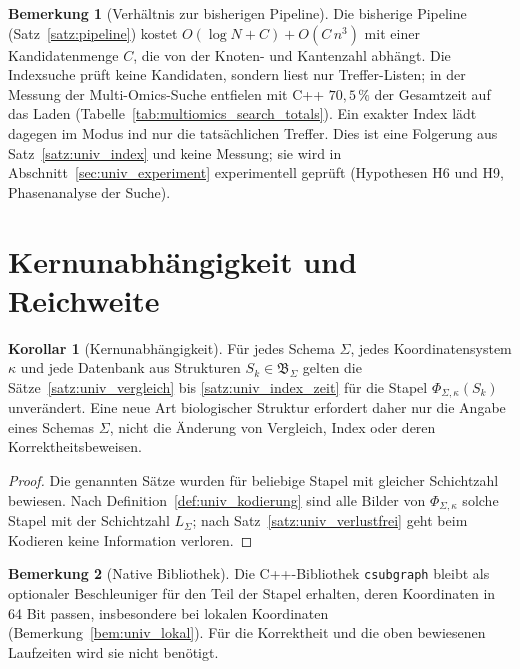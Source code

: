 \documentclass[a4paper,12pt, twoside]{report}
\theoremstyle{definition}
\newtheorem{bemerkung}{Bemerkung}
\newtheorem{korollar}{Korollar}
\begin{document}
\begin{bemerkung}[Verhältnis zur bisherigen Pipeline]
	Die bisherige Pipeline (Satz~\ref{satz:pipeline}) kostet $O(\log N+C)+O(C\,n^3)$ mit einer Kandidatenmenge $C$, die von der Knoten- und Kantenzahl abhängt. Die Indexsuche prüft keine Kandidaten, sondern liest nur Treffer-Listen; in der Messung der Multi-Omics-Suche entfielen mit C++ $70{,}5\,\%$ der Gesamtzeit auf das Laden (Tabelle~\ref{tab:multiomics_search_totals}). Ein exakter Index lädt dagegen im Modus ind nur die tatsächlichen Treffer. Dies ist eine Folgerung aus Satz~\ref{satz:univ_index} und keine Messung; sie wird in Abschnitt~\ref{sec:univ_experiment} experimentell geprüft (Hypothesen H6 und H9, Phasenanalyse der Suche).
\end{bemerkung}

\section{Kernunabhängigkeit und Reichweite}
\label{sec:univ_reichweite}

\begin{korollar}[Kernunabhängigkeit]
	\label{kor:univ_kern}
	Für jedes Schema $\Sigma$, jedes Koordinatensystem $\kappa$ und jede Datenbank aus Strukturen $S_k\in\mathfrak{B}_\Sigma$ gelten die Sätze~\ref{satz:univ_vergleich} bis \ref{satz:univ_index_zeit} für die Stapel $\Phi_{\Sigma,\kappa}(S_k)$ unverändert. Eine neue Art biologischer Struktur erfordert daher nur die Angabe eines Schemas $\Sigma$, nicht die Änderung von Vergleich, Index oder deren Korrektheitsbeweisen.
\end{korollar}

\begin{proof}
	Die genannten Sätze wurden für beliebige Stapel mit gleicher Schichtzahl bewiesen. Nach Definition~\ref{def:univ_kodierung} sind alle Bilder von $\Phi_{\Sigma,\kappa}$ solche Stapel mit der Schichtzahl $L_\Sigma$; nach Satz~\ref{satz:univ_verlustfrei} geht beim Kodieren keine Information verloren.
\end{proof}

\begin{bemerkung}[Native Bibliothek]
	Die C++-Bibliothek \texttt{csubgraph} bleibt als optionaler Beschleuniger für den Teil der Stapel erhalten, deren Koordinaten in 64 Bit passen, insbesondere bei lokalen Koordinaten (Bemerkung~\ref{bem:univ_lokal}). Für die Korrektheit und die oben bewiesenen Laufzeiten wird sie nicht benötigt.
\end{bemerkung}
\end{document}
